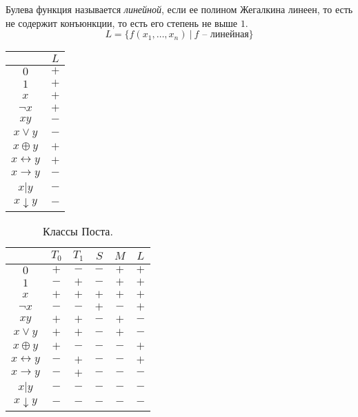 \begin{definition}
    Булева функция называется \emph{линейной}, если ее полином Жегалкина линеен, то есть не содержит конъюнкции, то есть его степень не выше $1$.
    \[
        L = \{f(x_1,\ldots,x_n) \ \big| \ f\text{ -- линейная}\}
    \]

    \begin{center}
        \begin{tabular}{c | c}
                                  & $L$ \\ [0.5ex]
            \hline
            $0$                   & $+$ \\
            $1$                   & $+$ \\
            $x$                   & $+$ \\
            $\lnot x$             & $+$ \\
            $xy$                  & $-$ \\
            $x\lor y$             & $-$ \\
            $x \oplus y$          & $+$ \\
            $x \leftrightarrow y$ & $+$ \\
            $x \rightarrow y$     & $-$ \\
            $x \vert y$           & $-$ \\
            $x \downarrow y$      & $-$ \\
        \end{tabular}
        \label{table:7}
    \end{center}
\end{definition}

\begin{table}[h!]
    \centering
    \begin{tabular}{c | c c c c c}
                              & $T_0$ & $T_1$ & $S$ & $M$ & $L$ \\ [0.5ex]
        \hline
        $0$                   & $+$   & $-$   & $-$ & $+$ & $+$ \\
        $1$                   & $-$   & $+$   & $-$ & $+$ & $+$ \\
        $x$                   & $+$   & $+$   & $+$ & $+$ & $+$ \\
        $\lnot x$             & $-$   & $-$   & $+$ & $-$ & $+$ \\
        $xy$                  & $+$   & $+$   & $-$ & $+$ & $-$ \\
        $x\lor y$             & $+$   & $+$   & $-$ & $+$ & $-$ \\
        $x \oplus y$          & $+$   & $-$   & $-$ & $-$ & $+$ \\
        $x \leftrightarrow y$ & $-$   & $+$   & $-$ & $-$ & $+$ \\
        $x \rightarrow y$     & $-$   & $+$   & $-$ & $-$ & $-$ \\
        $x \vert y$           & $-$   & $-$   & $-$ & $-$ & $-$ \\
        $x \downarrow y$      & $-$   & $-$   & $-$ & $-$ & $-$
    \end{tabular}
    \caption{Классы Поста.}
    \label{table:8}
\end{table}

